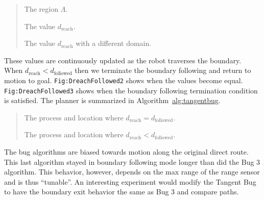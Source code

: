 \begin{quote}
The region \(\Lambda\).

The value \(d_{\text{reach}}\).

The value \(d_{\text{reach}}\) with a different domain.
\end{quote}

These values are continuously updated as the robot traverses the
boundary. When \(d_{\text{reach}} < d_{\text{followed}}\) then we
terminate the boundary following and return to motion to goal.
\texttt{Fig:DreachFollowed2} shows when the values become equal.
\texttt{Fig:DreachFollowed3} shows when the boundary following
termination condition is satisfied. The planner is summarized in
Algorithm~\href{..\%20topic::\%20\%20The\%20tangent\%20bug\%20algorithm}{alg:tangentbug}.

\begin{quote}
The process and location where
\(d_{\text{reach}} = d_{\text{followed}}\).

The process and location where
\(d_{\text{reach}} < d_{\text{followed}}\).
\end{quote}

The bug algorithms are biased towards motion along the original direct
route. This last algorithm stayed in boundary following mode longer than
did the Bug 3 algorithm. This behavior, however, depends on the max
range of the range sensor and is thus ``tunable''. An interesting
experiment would modify the Tangent Bug to have the boundary exit
behavior the same as Bug 3 and compare paths.

